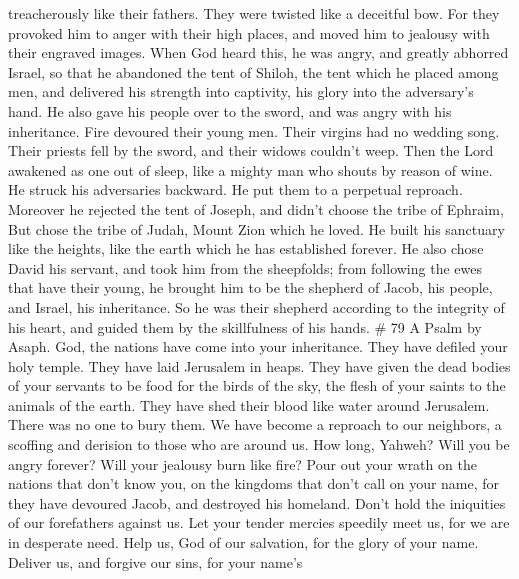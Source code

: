treacherously like their fathers. They were twisted like a deceitful
bow.  For they provoked him to anger with their high
places, and moved him to jealousy with their engraved images.
 When God heard this, he was angry, and greatly abhorred
Israel,  so that he abandoned the tent of Shiloh, the
tent which he placed among men,  and delivered his
strength into captivity, his glory into the adversary's hand.
 He also gave his people over to the sword, and was angry
with his inheritance.  Fire devoured their young men.
Their virgins had no wedding song.  Their priests fell by
the sword, and their widows couldn't weep.  Then the Lord
awakened as one out of sleep, like a mighty man who shouts by reason of
wine.  He struck his adversaries backward. He put them to
a perpetual reproach.  Moreover he rejected the tent of
Joseph, and didn't choose the tribe of Ephraim,  But
chose the tribe of Judah, Mount Zion which he loved.  He
built his sanctuary like the heights, like the earth which he has
established forever.  He also chose David his servant,
and took him from the sheepfolds;  from following the
ewes that have their young, he brought him to be the shepherd of Jacob,
his people, and Israel, his inheritance.  So he was their
shepherd according to the integrity of his heart, and guided them by the
skillfulness of his hands. \# 79 A Psalm by Asaph.  God,
the nations have come into your inheritance. They have defiled your holy
temple. They have laid Jerusalem in heaps.  They have
given the dead bodies of your servants to be food for the birds of the
sky, the flesh of your saints to the animals of the earth.
 They have shed their blood like water around Jerusalem.
There was no one to bury them.  We have become a reproach
to our neighbors, a scoffing and derision to those who are around us.
 How long, Yahweh? Will you be angry forever? Will your
jealousy burn like fire?  Pour out your wrath on the
nations that don't know you, on the kingdoms that don't call on your
name,  for they have devoured Jacob, and destroyed his
homeland.  Don't hold the iniquities of our forefathers
against us. Let your tender mercies speedily meet us, for we are in
desperate need.  Help us, God of our salvation, for the
glory of your name. Deliver us, and forgive our sins, for your name's
